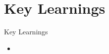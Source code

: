 \section{Key Learnings}
\begin{frame}{Key Learnings}
	\begin{itemize}
		\item 
	\end{itemize}
\end{frame}